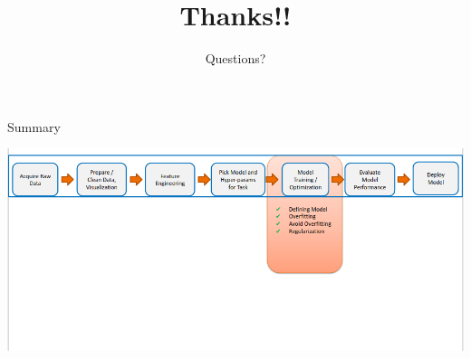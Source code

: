 \documentclass[aspectratio=169,14pt,usenames,dvipsnames]{beamer}
\begin{document}
\begin{frame}{Summary}

\includegraphics[width=1.015\textwidth, height=0.7\textheight]{Images/AIML_OFG_26.png}
\end{frame}

{\1
\begin{frame}
	\title{Thanks!!}
	\subtitle{Questions?}
	\maketitle
\end{frame}}
\end{document}
